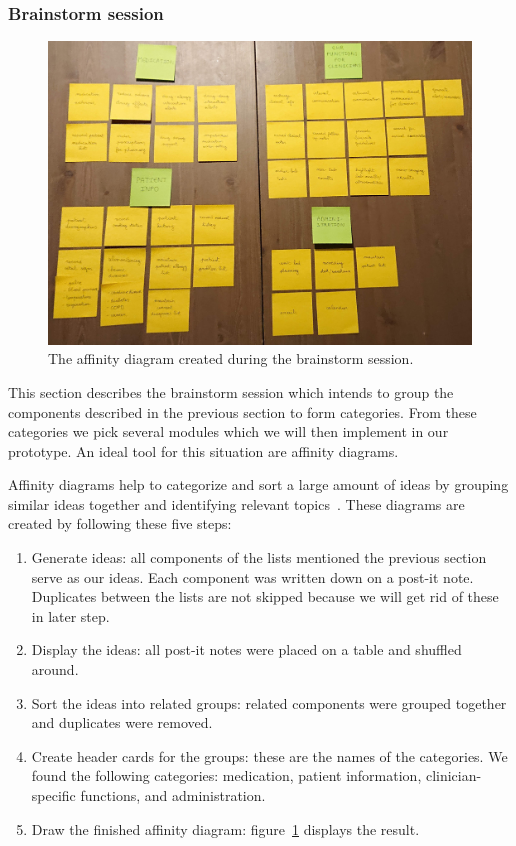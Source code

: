         \subsubsection{Brainstorm session}

        \begin{figure}[!t]
            \centering
            \includegraphics[width=1\textwidth]{chapters/3_design/affinity}
            \caption{The affinity diagram created during the brainstorm session.}\label{fig:affinity}
        \end{figure}
        This section describes the brainstorm session which intends to group the components described in the previous section to form categories. From these categories we pick several modules which we will then implement in our prototype. An ideal tool for this situation are affinity diagrams.

        Affinity diagrams help to categorize and sort a large amount of ideas by grouping similar ideas together and identifying relevant topics~\cite{Affinity}. These diagrams are created by following these five steps:
        \begin{enumerate}
            \item Generate ideas: all components of the lists mentioned the previous section serve as our ideas. Each component was written down on a post-it note. Duplicates between the lists are not skipped because we will get rid of these in later step.
            \item Display the ideas: all post-it notes were placed on a table and shuffled around.
            \item Sort the ideas into related groups: related components were grouped together and duplicates were removed. 
            \item Create header cards for the groups: these are the names of the categories. We found the following categories: medication, patient information, clinician-specific functions, and administration.
            \item Draw the finished affinity diagram: figure~\ref{fig:affinity} displays the result.
        \end{enumerate}

